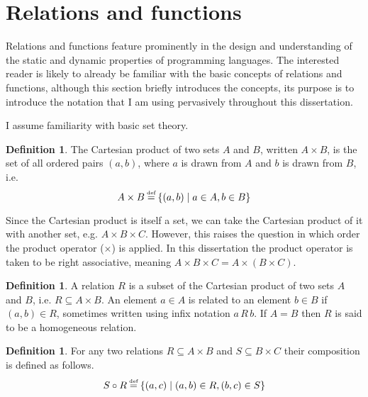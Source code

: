 \documentclass[12pt,phd,lfcs,twoside,openright,logo,leftchapter,normalheadings]{infthesis}
\theoremstyle{plain}
\theoremstyle{definition}
\newtheorem{definition}[theorem]{Definition}
\begin{document}
\section{Relations and functions}
\label{sec:functions}

Relations and functions feature prominently in the design and
understanding of the static and dynamic properties of programming
languages. The interested reader is likely to already be familiar with
the basic concepts of relations and functions, although this section
briefly introduces the concepts, its purpose is to introduce the
notation that I am using pervasively throughout this dissertation.
%

I assume familiarity with basic set theory.

\begin{definition}
  The Cartesian product of two sets $A$ and $B$, written $A \times B$,
  is the set of all ordered pairs $(a, b)$, where $a$ is drawn from
  $A$ and $b$ is drawn from $B$, i.e.
  \[
    A \times B \defas \{ (a, b) \mid a \in A, b \in B \}
  \]
\end{definition}
%
Since the Cartesian product is itself a set, we can take the Cartesian
product of it with another set, e.g. $A \times B \times C$. However,
this raises the question in which order the product operator
($\times$) is applied. In this dissertation the product operator is
taken to be right associative, meaning
$A \times B \times C = A \times (B \times C)$.
%
%
%


\begin{definition}
  A relation $R$ is a subset of the Cartesian product of two sets $A$
  and $B$, i.e. $R \subseteq A \times B$.
  An element $a \in A$ is related to an element $b \in B$ if
  $(a, b) \in R$, sometimes written using infix notation $a\,R\,b$.
  If $A = B$ then $R$ is said to be a homogeneous relation.
\end{definition}
%

\begin{definition}
  For any two relations $R \subseteq A \times B$ and
  $S \subseteq B \times C$ their composition is defined as follows.
  \[
    S \circ R \defas \{ (a,c) \mid (a,b) \in R, (b, c) \in S \}
  \]
\end{definition}
\end{document}
